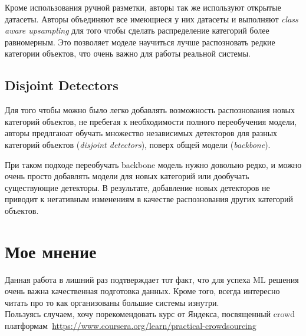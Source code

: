 Кроме использования ручной разметки, авторы так же используют открытые датасеты.
Авторы объединяют все имеющиеся у них датасеты и выполняют \textit{class aware upsampling} для того чтобы сделать распределение категорий более равномерным. 
Это позволяет моделе научиться лучше распозновать редкие категории объектов, что очень важно для работы реальной системы.

\subsection*{Disjoint Detectors}

Для того чтобы можно было легко добавлять возможность распознования новых категорий объектов, не пребегая к необходимости полного переобучения модели, авторы предлгаюат обучать множество независимых детекторов для разных категорий объектов (\textit{disjoint detectors}), поверх общей модели (\textit{backbone}).

При таком подходе переобучать backbone модель нужно довольно редко, и можно очень просто добавлять модели для новых категорий или дообучать существующие детекторы. 
В результате, добавление новых детекторов не приводит к негативным изменениям в качестве распознования других категорий объектов.

\section*{Мое мнение}

Данная работа в лишний раз подтверждает тот факт, что для успеха ML решения очень важна качественная подготовка данных.
Кроме того, всегда интересно читать про то как организованы большие системы изнутри. \\

Пользуясь случаем, хочу порекомендовать курс от Яндекса, посвященный crowd платформам~\url{https://www.coursera.org/learn/practical-crowdsourcing}